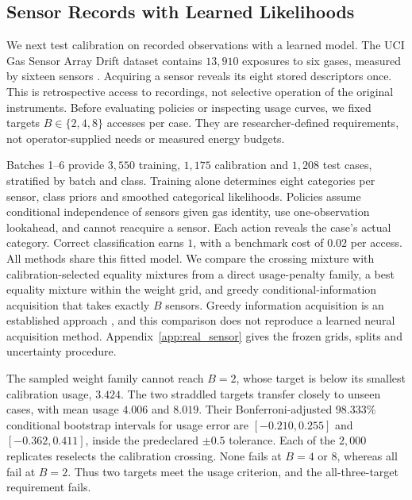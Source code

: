 \documentclass[manuscript, screen, review]{jair}
\begin{document}
\subsection{Sensor Records with Learned Likelihoods}
\label{sec:real_sensor}

We next test calibration on recorded observations with a learned model. The UCI Gas Sensor Array Drift dataset contains $13{,}910$ exposures to six gases, measured by sixteen sensors \citep{vergara2012data,vergara2012}. Acquiring a sensor reveals its eight stored descriptors once. This is retrospective access to recordings, not selective operation of the original instruments. Before evaluating policies or inspecting usage curves, we fixed targets $B\in\{2,4,8\}$ accesses per case. They are researcher-defined requirements, not operator-supplied needs or measured energy budgets.

Batches 1--6 provide $3{,}550$ training, $1{,}175$ calibration and $1{,}208$ test cases, stratified by batch and class. Training alone determines eight categories per sensor, class priors and smoothed categorical likelihoods. Policies assume conditional independence of sensors given gas identity, use one-observation lookahead, and cannot reacquire a sensor. Each action reveals the case's actual category. Correct classification earns $1$, with a benchmark cost of $0.02$ per access. All methods share this fitted model. We compare the crossing mixture with calibration-selected equality mixtures from a direct usage-penalty family, a best equality mixture within the weight grid, and greedy conditional-information acquisition that takes exactly $B$ sensors. Greedy information acquisition is an established approach \citep{covert2023}, and this comparison does not reproduce a learned neural acquisition method. Appendix~\ref{app:real_sensor} gives the frozen grids, splits and uncertainty procedure.

The sampled weight family cannot reach $B=2$, whose target is below its smallest calibration usage, $3.424$. The two straddled targets transfer closely to unseen cases, with mean usage $4.006$ and $8.019$. Their Bonferroni-adjusted $98.333\%$ conditional bootstrap intervals for usage error are $[-0.210,0.255]$ and $[-0.362,0.411]$, inside the predeclared $\pm0.5$ tolerance. Each of the $2{,}000$ replicates reselects the calibration crossing. None fails at $B=4$ or $8$, whereas all fail at $B=2$. Thus two targets meet the usage criterion, and the all-three-target requirement fails.
\end{document}

